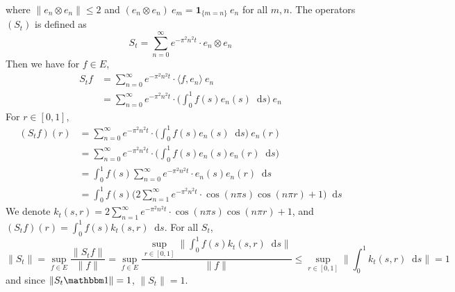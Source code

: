 \documentclass[12pt, reqno]{amsart}
\renewcommand{\leq}{\leqslant}
\newcommand{\1}{\mathbbm 1}
\newcommand*\diff{\mathop{}\!\mathrm{d}}
\theoremstyle{plain}
\theoremstyle{definition}
\begin{document}
where $\|e_n\otimes e_n\| \leq 2$ and  $(e_n\otimes e_n)\ e_m=\mathbf{1}_{\{m=n\}}\ e_n$ for all $m,n$. The operators $(S_t)$ is defined as 
\begin{equation}\label{eq:diff-semi}
	S_t=\sum_{n=0}^{\infty} e^{-\pi^2n^2 t} \cdot e_n\otimes e_n
\end{equation}
Then we have for $f\in E$,
\begin{align*}
	S_tf&=\sum_{n=0}^{\infty} e^{-\pi^2n^2 t} \cdot \langle f,e_n \big \rangle\ e_n\\
	       &=\sum_{n=0}^{\infty} e^{-\pi^2n^2 t} \cdot \Big (\int_{0}^{1}f(s)e_n(s)\diff s\Big)\ e_n
\end{align*}
For $r\in [0,1]$, 
\begin{align*}
	(S_tf)(r)&=\sum_{n=0}^{\infty} e^{-\pi^2n^2 t} \cdot \Big (\int_{0}^{1}f(s)e_n(s)\diff s\Big)\ e_n(r)\\
	               &=\sum_{n=0}^{\infty} e^{-\pi^2n^2 t} \cdot \Big (\int_{0}^{1}f(s)e_n(s)e_n(r)\diff s\Big)\ \\
	               &=\int_{0}^{1}f(s)\sum_{n=0}^{\infty} e^{-\pi^2n^2 t} \cdot e_n(s)e_n(r)\diff s \\
	               &=\int_{0}^{1}f(s)\Big(2\sum_{n=1}^{\infty} e^{-\pi^2n^2 t} \cdot \cos(n\pi s)\cos(n\pi r)+1\Big)\diff s 	               
\end{align*}
We denote $k_t(s,r)=2\sum_{n=1}^{\infty} e^{-\pi^2n^2 t} \cdot \cos(n\pi s)\cos(n\pi r)+1$, and $(S_tf)(r)=\int_{0}^{1}f(s) k_t(s,r)\diff s $. For all $S_t$,
\begin{equation*}
	\|S_t\|=\sup_{f\in E}\frac{\|S_t f\|}{\|f\|}=\sup_{f\in E}\frac{\sup_{r\in [0,1]}\|\int_{0}^{1}f(s) k_t(s,r)\diff s \|}{\|f\|}\leq \sup_{r\in [0,1]}\|\int_{0}^{1}k_t(s,r)\diff s \|=1
\end{equation*}
and since $\|S_t\1\|=1$, $\|S_t\|=1.$
\end{document}
